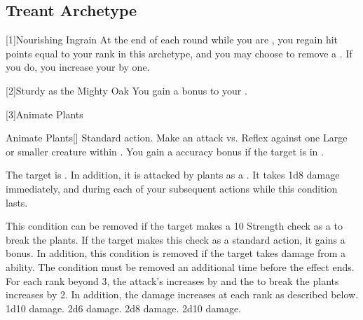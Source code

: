   \subsection{Treant Archetype}

    [1]{Nourishing Ingrain} At the end of each round while you are , you regain hit points equal to your rank in this archetype, and you may choose to remove a .
      If you do, you increase your  by one.

    [2]{Sturdy as the Mighty Oak} You gain a  bonus to your .

    [3]{Animate Plants}
      \begin{magicalactiveability}{Animate Plants}[]
        \abilityusagetime Standard action.
        \rankline
        Make an attack vs. Reflex against one Large or smaller  creature within \medrange.
        You gain a  accuracy bonus if the target is in .

        \hit The target is  \slowed.
        In addition, it is attacked by plants as a .
        It takes 1d8 damage immediately, and during each of your subsequent actions while this condition lasts.

        This condition can be removed if the target makes a  10 Strength check as a  to break the plants.
        If the target makes this check as a standard action, it gains a  bonus.
        In addition, this condition is removed if the target takes damage from a \atFire ability.
        \crit The condition must be removed an additional time before the effect ends.
        \rankline
        For each rank beyond 3, the attack's  increases by  and the  to break the plants increases by 2.
        In addition, the damage increases at each rank as described below.
         1d10 damage.
         2d6 damage.
         2d8 damage.
         2d10 damage.
      \end{magicalactiveability}

